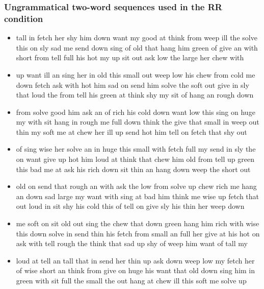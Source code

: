 \documentclass[10pt,letterpaper]{article}
\begin{document}
\subsubsection*{Ungrammatical two-word sequences used in the RR condition}

\begin{itemize}

\item tall in fetch her shy him down want my good at think from weep
  ill the solve this on sly sad me send down sing of old that hang him
  green of give an with short from tell full his hot my up sit out ask
  low the large her chew with

\item up want ill an sing her in old this small out weep low his chew
  from cold me down fetch ask with hot him sad on send him solve the
  soft out give in sly that loud the from tell his green at think shy
  my sit of hang an rough down

\item from solve good him ask an of rich his cold down want low this
  sing on huge my with sit hang in rough me full down think the give
  that small in weep out thin my soft me at chew her ill up send hot
  him tell on fetch that shy out

\item of sing wise her solve an in huge this small with fetch full my
  send in sly the on want give up hot him loud at think that chew him
  old from tell up green this bad me at ask his rich down sit thin an
  hang down weep the short out

\item old on send that rough an with ask the low from solve up chew
  rich me hang an down sad large my want with sing at bad him think me
  wise up fetch that out loud in sit shy his cold this of tell on give
  sly his thin her weep down

\item me soft on sit old out sing the chew that down green hang him
  rich with wise this down solve in send thin his fetch from small an
  full her give at his hot on ask with tell rough the think that sad
  up shy of weep him want of tall my

\item loud at tell an tall that in send her thin up ask down weep low
  my fetch her of wise short an think from give on huge his want that
  old down sing him in green with sit full the small the out hang at
  chew ill this soft me solve up


\end{itemize}
\end{document}
